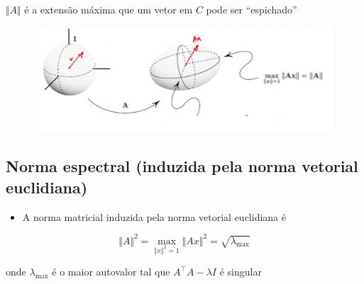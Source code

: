 \documentclass[
  letterpaper,
  DIV=11,
  numbers=noendperiod]{scrartcl}
\providecommand{\tightlist}{%
  \setlength{\itemsep}{0pt}\setlength{\parskip}{0pt}}\usepackage{longtable,booktabs,array}
\begin{document}
\(\Vert A\Vert\) é a extensão máxima que um vetor em \(C\) pode ser
``espichado''

\begin{figure}

{\centering \includegraphics[width=1\textwidth,height=\textheight]{figs/Aula07/norma_interpretacao.png}

}

\end{figure}

\hypertarget{norma-espectral-induzida-pela-norma-vetorial-euclidiana}{%
\subsection{Norma espectral (induzida pela norma vetorial
euclidiana)}\label{norma-espectral-induzida-pela-norma-vetorial-euclidiana}}

\begin{itemize}
\tightlist
\item
  A norma matricial induzida pela norma vetorial euclidiana é
\end{itemize}

\[ \Vert A \Vert^2 = \max_{\Vert x\Vert^2 = 1}{\Vert Ax\Vert^2 = \sqrt{\lambda_{\text{max}}}}\]

onde \(\lambda_{\text{max}}\) é o maior autovalor tal que
\(A^\top A-\lambda I\) é singular
\end{document}
